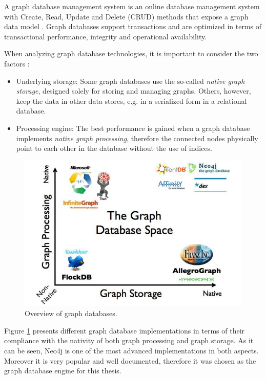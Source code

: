 \documentclass[12pt]{report}
\begin{document}
A graph database management system is an online database management system with Create, Read, Update and Delete (CRUD) methods that expose a graph data model \cite{graph_databases}. Graph databases support transactions and are optimized in terms of transactional performance, integrity and operational availability.

When analyzing graph database technologies, it is important to consider the two factors \cite{graph_databases}:
\begin{itemize}
\item Underlying storage: Some graph databases use the so-called \textit{native graph storage}, designed solely for storing and managing graphs. Others, however, keep the data in other data stores, e.g. in a serialized form in a relational database.
\item Processing engine: The best performance is gained when a graph database implements \textit{native graph processing}, therefore the connected nodes physically point to each other in the database without the use of indices.
\end{itemize}

\begin{figure}[!t]
\centering
\includegraphics[width=\textwidth]{graph_databases_comp.jpg} 
\caption[Overview of graph databases.]{Overview of graph databases.\footnotemark{}}
\label{fig.graph_databases}
\end{figure}

Figure \ref{fig.graph_databases} presents different graph database implementations in terms of their compliance with the nativity of both graph processing and graph storage. As it can be seen, Neo4j is one of the most advanced implementations in both aspects. Moreover it is very popular and well documented, therefore it was chosen as the graph database engine for this thesis.
\end{document}
